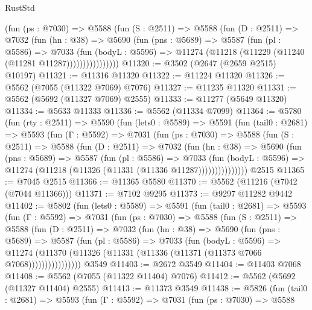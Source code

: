 \begin{lexlean}{RustStd}
\begin{coremodule}
              (fun (ps : @7030) =>
              @5588
                (fun (S : @2511) =>
                @5588
                  (fun (D : @2511) =>
                  @7032
                    (fun (hn : @38) =>
                    @5690
                      (fun (pns : @5689) =>
                      @5587
                        (fun (pl : @5586) =>
                        @7033
                          (fun (bodyL : @5596) =>
                          @11274 (@11218 (@11229 (@11240 (@11281 @11287))))))))))))))))
@11320 := @3502 (@2647 (@2659 @2515) @10197)
@11321 := @11316 @11320
@11322 := @11224 @11320
@11326 := @5562 (@7055 (@11322 @7069) @7076)
@11327 := @11235 @11320
@11331 := @5562 (@5692 (@11327 @7069) @2555)
@11333 := @11277 (@5649 @11320)
@11334 := @5633 @11333
@11336 := @5562 (@11334 @7099)
@11364 := @5780
    (fun (rty : @2511) =>
    @5590
      (fun (lets0 : @5589) =>
      @5591
        (fun (tail0 : @2681) =>
        @5593
          (fun (Γ : @5592) =>
          @7031
            (fun (ps : @7030) =>
            @5588
              (fun (S : @2511) =>
              @5588
                (fun (D : @2511) =>
                @7032
                  (fun (hn : @38) =>
                  @5690
                    (fun (pns : @5689) =>
                    @5587
                      (fun (pl : @5586) =>
                      @7033
                        (fun (bodyL : @5596) =>
                        @11274 (@11218 (@11326 (@11331 (@11336 @11287)))))))))))))))
    @2515
@11365 := @7045 @2515
@11366 := @11365 @5580
@11370 := @5562 (@11216 (@7042 (@7044 @11366)))
@11371 := @7102 @9295
@11373 := @9297 @11282 @9442
@11402 := @5802
    (fun (lets0 : @5589) =>
    @5591
      (fun (tail0 : @2681) =>
      @5593
        (fun (Γ : @5592) =>
        @7031
          (fun (ps : @7030) =>
          @5588
            (fun (S : @2511) =>
            @5588
              (fun (D : @2511) =>
              @7032
                (fun (hn : @38) =>
                @5690
                  (fun (pns : @5689) =>
                  @5587
                    (fun (pl : @5586) =>
                    @7033
                      (fun (bodyL : @5596) =>
                      @11274
                        (@11370 (@11326 (@11331 (@11336 (@11371 (@11373 @7066 @7068))))))))))))))))
    @3549
@11403 := @2672 @3549
@11404 := @11403 @7068
@11408 := @5562 (@7055 (@11322 @11404) @7076)
@11412 := @5562 (@5692 (@11327 @11404) @2555)
@11413 := @11373 @3549
@11438 := @5826
    (fun (tail0 : @2681) =>
    @5593
      (fun (Γ : @5592) =>
      @7031
        (fun (ps : @7030) =>
        @5588

\end{coremodule}
\end{lexlean}
